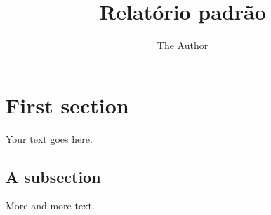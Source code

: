 \documentclass[11pt]{article}
\title{Relatório padrão}
\author{The Author}
\begin{document}
\maketitle

\section{First section}

Your text goes here.

\subsection{A subsection}

More and more text.
\end{document}
